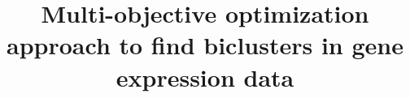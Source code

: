 \documentclass{bmcart}
\begin{document}
\begin{frontmatter}

\begin{fmbox}


\title{Multi-objective optimization approach to find biclusters in gene expression data}


\author[
   addressref={aff1},
   email={jjdale@mail.missouri.edu}
]{ }
\author[
   addressref={aff1},
   email={Junya009@live.missouristate.edu}
]{ }
\author[
   addressref={aff2},
      corref={aff2},                      %
   email={tayoobafemiajayi@missouristate.edu}
]{ }


\address[id=aff1]{%
  ,
  ,
}
\address[id=aff2]{%
  ,
   ,
}


\end{fmbox}
\end{frontmatter}
\end{document}
